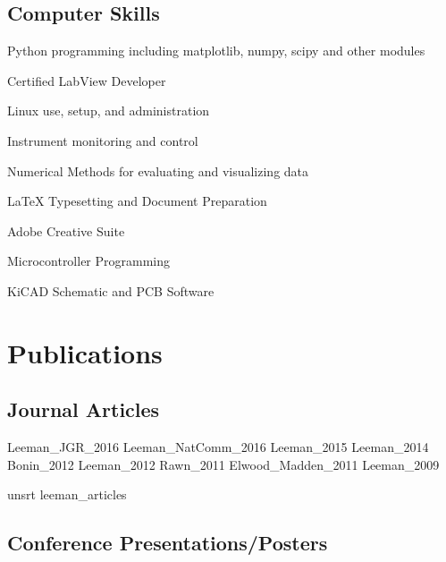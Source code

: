 \documentclass[letterpaper]{article}
\renewenvironment{itemize}{
  \begin{list}{}{
    \setlength{\leftmargin}{1.5em}
  }
}{
  \end{list}
}
\begin{document}
\subsection*{Computer Skills}

\begin{itemize}
\item Python programming including matplotlib, numpy, scipy and other modules
\item Certified LabView Developer
\item Linux use, setup, and administration
\item Instrument monitoring and control
\item Numerical Methods for evaluating and visualizing data
\item \LaTeX{} Typesetting and Document Preparation
\item Adobe Creative Suite
\item Microcontroller Programming
\item KiCAD Schematic and PCB Software
\end{itemize}



\section*{Publications}



\subsection*{Journal Articles}

\begingroup
\renewcommand{\section}[2]{}

\nocite{journal}{Leeman_JGR_2016}
\nocite{journal}{Leeman_NatComm_2016}
\nocite{journal}{Leeman_2015}
\nocite{journal}{Leeman_2014}
\nocite{journal}{Bonin_2012}
\nocite{journal}{Leeman_2012}
\nocite{journal}{Rawn_2011}
\nocite{journal}{Elwood_Madden_2011}
\nocite{journal}{Leeman_2009}

{unsrt}
{leeman_articles}{}
\endgroup

\subsection*{Conference Presentations/Posters}
\end{document}
